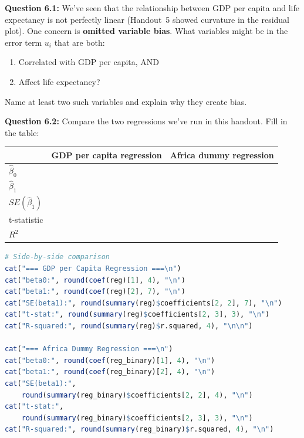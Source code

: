 \documentclass[11pt,letterpaper]{article}
\begin{document}
\textbf{Question 6.1:} We've seen that the relationship between GDP per capita and life expectancy is not perfectly linear (Handout~5 showed curvature in the residual plot). One concern is \textbf{omitted variable bias}. What variables might be in the error term $u_i$ that are both:
\begin{enumerate}
\item Correlated with GDP per capita, AND
\item Affect life expectancy?
\end{enumerate}

Name at least two such variables and explain why they create bias.

\vspace{4cm}

\textbf{Question 6.2:} Compare the two regressions we've run in this handout. Fill in the table:

\begin{center}
\begin{tabular}{l|c|c}
\toprule
 & GDP per capita regression & Africa dummy regression \\
\midrule
$\hat{\beta}_0$ & & \\[6pt]
$\hat{\beta}_1$ & & \\[6pt]
$SE(\hat{\beta}_1)$ & & \\[6pt]
t-statistic & & \\[6pt]
$R^2$ & & \\
\bottomrule
\end{tabular}
\end{center}

\begin{lstlisting}[language=R]
# Side-by-side comparison
cat("=== GDP per Capita Regression ===\n")
cat("beta0:", round(coef(reg)[1], 4), "\n")
cat("beta1:", round(coef(reg)[2], 7), "\n")
cat("SE(beta1):", round(summary(reg)$coefficients[2, 2], 7), "\n")
cat("t-stat:", round(summary(reg)$coefficients[2, 3], 3), "\n")
cat("R-squared:", round(summary(reg)$r.squared, 4), "\n\n")

cat("=== Africa Dummy Regression ===\n")
cat("beta0:", round(coef(reg_binary)[1], 4), "\n")
cat("beta1:", round(coef(reg_binary)[2], 4), "\n")
cat("SE(beta1):",
    round(summary(reg_binary)$coefficients[2, 2], 4), "\n")
cat("t-stat:",
    round(summary(reg_binary)$coefficients[2, 3], 3), "\n")
cat("R-squared:", round(summary(reg_binary)$r.squared, 4), "\n")
\end{lstlisting}

\vspace{0.5cm}
\end{document}
